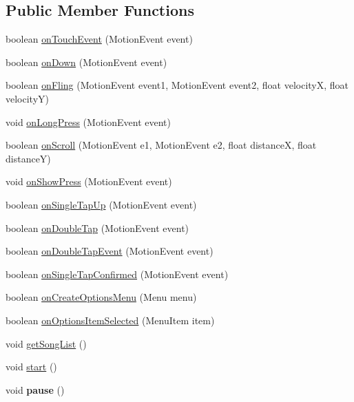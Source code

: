 \subsection*{Public Member Functions}
\begin{DoxyCompactItemize}
\item 
boolean \hyperlink{classcom_1_1chopin_1_1MainActivity_a7ec09bc1bf1dcc68d369944ef5fed402}{on\+Touch\+Event} (Motion\+Event event)
\item 
boolean \hyperlink{classcom_1_1chopin_1_1MainActivity_ab5d46829409221b8219ac8b62532d913}{on\+Down} (Motion\+Event event)
\item 
boolean \hyperlink{classcom_1_1chopin_1_1MainActivity_a36c4ffe7e22d3f38f76fb983a360e220}{on\+Fling} (Motion\+Event event1, Motion\+Event event2, float velocity\+X, float velocity\+Y)
\item 
void \hyperlink{classcom_1_1chopin_1_1MainActivity_a447c24c7e4c1b41a0dc5c0d79b9ad7fe}{on\+Long\+Press} (Motion\+Event event)
\item 
boolean \hyperlink{classcom_1_1chopin_1_1MainActivity_aa76ce37b188dd077445f1aed639c2f13}{on\+Scroll} (Motion\+Event e1, Motion\+Event e2, float distance\+X, float distance\+Y)
\item 
void \hyperlink{classcom_1_1chopin_1_1MainActivity_aae7a255f30fa62752950d9c90d7e68b2}{on\+Show\+Press} (Motion\+Event event)
\item 
boolean \hyperlink{classcom_1_1chopin_1_1MainActivity_a128a997abbbee5a98a2898b0fe133bcc}{on\+Single\+Tap\+Up} (Motion\+Event event)
\item 
boolean \hyperlink{classcom_1_1chopin_1_1MainActivity_a09ebaf817b98ece078802a4506ac21e8}{on\+Double\+Tap} (Motion\+Event event)
\item 
boolean \hyperlink{classcom_1_1chopin_1_1MainActivity_a5a850938c326c53f4f7f9bed58c7d606}{on\+Double\+Tap\+Event} (Motion\+Event event)
\item 
boolean \hyperlink{classcom_1_1chopin_1_1MainActivity_afac4ea8c714deb0bb38f98f96d8d0752}{on\+Single\+Tap\+Confirmed} (Motion\+Event event)
\item 
boolean \hyperlink{classcom_1_1chopin_1_1MainActivity_adc17ea5ad991259ddeeeb7f7ba1e9e6c}{on\+Create\+Options\+Menu} (Menu menu)
\item 
boolean \hyperlink{classcom_1_1chopin_1_1MainActivity_a84a10910a3e427d8043dc84cf80b103d}{on\+Options\+Item\+Selected} (Menu\+Item item)
\item 
void \hyperlink{classcom_1_1chopin_1_1MainActivity_a1d1874fbf0786331a959fdd2faafe693}{get\+Song\+List} ()
\item 
void \hyperlink{classcom_1_1chopin_1_1MainActivity_a3d12c6d0b2f85579ff3f3819dd37afd7}{start} ()
\item 
\hypertarget{classcom_1_1chopin_1_1MainActivity_a83db75eb8bc461f4c54f3bf584604a04}{}void {\bfseries pause} ()\label{classcom_1_1chopin_1_1MainActivity_a83db75eb8bc461f4c54f3bf584604a04}


\end{DoxyCompactItemize}
